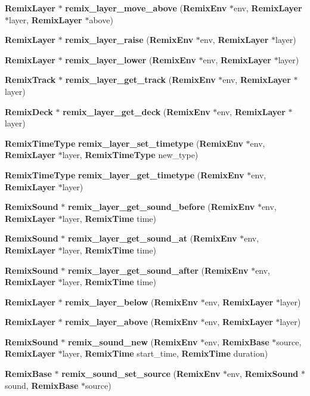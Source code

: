 \begin{CompactItemize}
\item 
{\bf Remix\-Layer} $\ast$ {\bf remix\_\-layer\_\-move\_\-above} ({\bf Remix\-Env} $\ast$env, {\bf Remix\-Layer} $\ast$layer, {\bf Remix\-Layer} $\ast$above)
\item 
{\bf Remix\-Layer} $\ast$ {\bf remix\_\-layer\_\-raise} ({\bf Remix\-Env} $\ast$env, {\bf Remix\-Layer} $\ast$layer)
\item 
{\bf Remix\-Layer} $\ast$ {\bf remix\_\-layer\_\-lower} ({\bf Remix\-Env} $\ast$env, {\bf Remix\-Layer} $\ast$layer)
\item 
{\bf Remix\-Track} $\ast$ {\bf remix\_\-layer\_\-get\_\-track} ({\bf Remix\-Env} $\ast$env, {\bf Remix\-Layer} $\ast$layer)
\item 
{\bf Remix\-Deck} $\ast$ {\bf remix\_\-layer\_\-get\_\-deck} ({\bf Remix\-Env} $\ast$env, {\bf Remix\-Layer} $\ast$layer)
\item 
{\bf Remix\-Time\-Type} {\bf remix\_\-layer\_\-set\_\-timetype} ({\bf Remix\-Env} $\ast$env, {\bf Remix\-Layer} $\ast$layer, {\bf Remix\-Time\-Type} new\_\-type)
\item 
{\bf Remix\-Time\-Type} {\bf remix\_\-layer\_\-get\_\-timetype} ({\bf Remix\-Env} $\ast$env, {\bf Remix\-Layer} $\ast$layer)
\item 
{\bf Remix\-Sound} $\ast$ {\bf remix\_\-layer\_\-get\_\-sound\_\-before} ({\bf Remix\-Env} $\ast$env, {\bf Remix\-Layer} $\ast$layer, {\bf Remix\-Time} time)
\item 
{\bf Remix\-Sound} $\ast$ {\bf remix\_\-layer\_\-get\_\-sound\_\-at} ({\bf Remix\-Env} $\ast$env, {\bf Remix\-Layer} $\ast$layer, {\bf Remix\-Time} time)
\item 
{\bf Remix\-Sound} $\ast$ {\bf remix\_\-layer\_\-get\_\-sound\_\-after} ({\bf Remix\-Env} $\ast$env, {\bf Remix\-Layer} $\ast$layer, {\bf Remix\-Time} time)
\item 
{\bf Remix\-Layer} $\ast$ {\bf remix\_\-layer\_\-below} ({\bf Remix\-Env} $\ast$env, {\bf Remix\-Layer} $\ast$layer)
\item 
{\bf Remix\-Layer} $\ast$ {\bf remix\_\-layer\_\-above} ({\bf Remix\-Env} $\ast$env, {\bf Remix\-Layer} $\ast$layer)
\item 
{\bf Remix\-Sound} $\ast$ {\bf remix\_\-sound\_\-new} ({\bf Remix\-Env} $\ast$env, {\bf Remix\-Base} $\ast$source, {\bf Remix\-Layer} $\ast$layer, {\bf Remix\-Time} start\_\-time, {\bf Remix\-Time} duration)
\item 
{\bf Remix\-Base} $\ast$ {\bf remix\_\-sound\_\-set\_\-source} ({\bf Remix\-Env} $\ast$env, {\bf Remix\-Sound} $\ast$sound, {\bf Remix\-Base} $\ast$source)

\end{CompactItemize}

